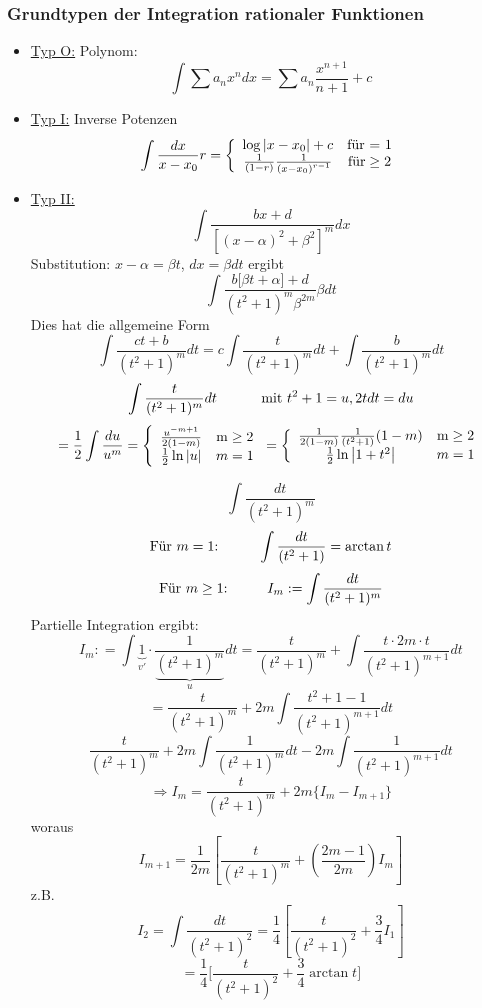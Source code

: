 \subsubsection*{Grundtypen der Integration rationaler Funktionen}
\begin{itemize}
\item \underline{Typ O:} Polynom:$$\int \sum a_{n}x^{n}dx=\sum a_{n}\dfrac {x^{n+1}}{n+1}+c$$
\item \underline{Typ I:} Inverse Potenzen \[\int {\frac{{dx}}{{x - {x_0}}}r}  = \left\{ {\begin{array}{*{20}{c}}
{\log \left| {x - {x_0}} \right| + c}&{{\text{für = 1}}}\\
{\frac{1}{{(1 - r)}}\frac{1}{{{{(x - {x_0})}^{r - 1}}}}}&{{\text{für}} \ge {\rm{2}}}
\end{array}} \right.\]

\item \underline{Typ II:}
$$\int { \dfrac {bx+d}{\left[ \left( x-\alpha \right) ^{2}+\beta ^{2}\right] ^{m}}dx}$$
Substitution: $x-\alpha =\beta t$, $dx=\beta dt$ ergibt $$\int {\dfrac {b\lbrack \beta t+\alpha\rbrack +d}{(t^2 +1)^m \beta ^{2m}} \beta dt}$$ Dies hat die allgemeine Form $$\int{\frac{ct+b}{(t^2+1)^m}dt}=c\int{\frac{t}{(t^2 +1)^m}dt}+\int{\frac{b}{(t^2 +1)^m} dt}$$
$$\int{\frac{t}{(t^2 +1)^m}dt}\text{\hspace{10mm} mit }t^2+1=u, 2t dt=du$$
$$=\frac{1}{2}\int{\frac{du}{u^m}} = \left\{ {\begin{array}{*{20}{c}}
{\frac{{{u^{ - m + 1}}}}{{2(1 - m)}}}&{{\rm{m}} \ge 2}\\
{\frac{1}{2}\ln \left| u \right|}&{m = 1}
\end{array}} \right. = \left\{ {\begin{array}{*{20}{c}}
{\frac{1}{{2(1 - m)}}\frac{1}{{({t^2} + 1)}}(1 - m)}&{{\rm{m}} \ge 2}\\
{\frac{1}{2}\ln \left| {1 + {t^2}} \right|}&{m = 1}
\end{array}} \right.$$

$$\int{\frac{dt}{(t^2 +1)^m}}$$
$$\text{Für $m=1$:\hspace{10mm}}\int{\frac{dt}{(t^2 +1)}}=\arctan t$$
$$\text{Für $m\geq1$:\hspace{10mm}}I_m:=\int{\frac{dt}{(t^2 +1)^m}}$$
Partielle Integration ergibt:
\[{I_m}: = \int {\underbrace 1_{v'} \cdot \frac{1}{{\underbrace {{{({t^2} + 1)}^m}}_u}}dt}  = \frac{t}{{{{({t^2} + 1)}^m}}} + \int {\frac{{t \cdot 2m \cdot t}}{{{{({t^2} + 1)}^{m + 1}}}}dt} \]
$$=\frac{t}{(t^2 +1)^m} + 2m\int{\frac{t^2 +1-1}{(t^2 +1)^{m+1}}dt}$$
$$\frac{t}{(t^2 +1)^m}+2m\int{\frac{1}{(t^2 +1)^m}dt}-2m\int{\frac{1}{(t^2 +1)^{m+1}}dt}$$
$$\Rightarrow I_m=\frac{t}{(t^2 +1)^m}+2m\{ I_m - I_{m+1} \}$$
woraus $$I_{m+1}=\frac{1}{2m}\left[\frac{t}{(t^2 +1)^m} + \left(\frac{2m-1}{2m}\right)I_m\right]$$
z.B.$$I_2=\int{\frac{dt}{(t^2 +1)^2}}=\frac{1}{4}\left[ \frac{t}{(t^2 +1)^2}+\frac{3}{4}I_1\right]$$
$$=\frac{1}{4}\lbrack \frac{t}{(t^2 +1)^2}+\frac{3}{4}\arctan t\rbrack$$
\end{itemize}
